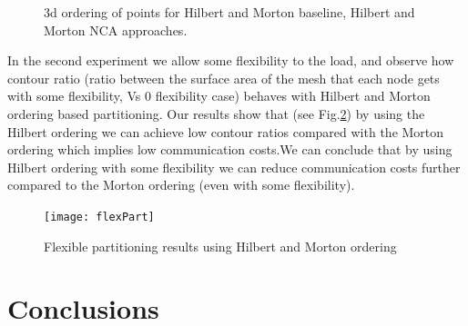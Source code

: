\documentclass[a0,landscape]{a0poster}
\begin{document}
\begin{multicols}{4}
\begin{figure}[H]
\caption{3d ordering of points for Hilbert and Morton baseline, Hilbert and Morton NCA approaches.\label{3d_NCA}}
\end{figure}
% 

In the second experiment we allow some flexibility to the load, and observe how contour ratio (ratio between the surface area of the mesh that each node gets with some flexibility, Vs 0 flexibility case)
behaves with Hilbert and Morton ordering based partitioning. Our results show that (see Fig.\ref{flexibility}) by using the Hilbert ordering we can achieve low contour ratios compared with the Morton ordering which implies low
communication costs.We can conclude that by using Hilbert ordering with some flexibility we can reduce communication costs further compared to the Morton ordering (even with some flexibility).


\begin{figure}[H]
\centering
\texttt{[image: flexPart]}
\caption{ Flexible partitioning results using Hilbert and Morton ordering \label{flexibility}}
\end{figure}



\color{SaddleBrown} %

\section*{Conclusions}


\end{multicols}
\end{document}

